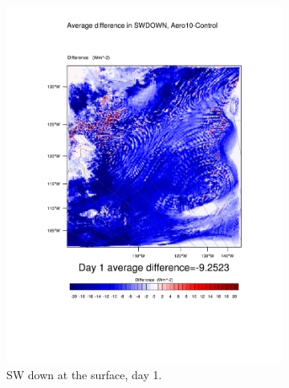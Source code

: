 \begin{figure}
\centering
	\begin{subfigure}{0.48\textwidth}
		\includegraphics[width=\textwidth]{results/aero10/diff_Aero10_SWDOWN_Day1.pdf}
		\caption{SW down at the surface, day 1.}
		\label{subfig:swdown_r3Day1}
	\end{subfigure}
	\quad
	\begin{subfigure}{0.48\textwidth}
		\centering

\end{subfigure}
\end{figure}
